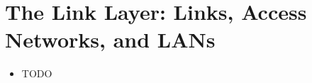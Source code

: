 \section{The Link Layer: Links, Access Networks, and LANs}
\begin{itemize}

\item TODO

\end{itemize}